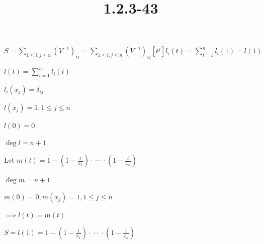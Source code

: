 \documentclass{article}
\title{1.2.3-43}
\begin{document}
\maketitle

$S = \sum_{1 \leq i,j \leq n} (V^{-1})_{ij} = \sum_{1 \leq i,j \leq n} (V^{-1})_{ij} [t^j]l_i(t) = \sum_{i=1}^n l_i(1) = l(1)$

$l(t) = \sum_{i=1}^n l_i(t)$

$l_i(x_j) = \delta_{ij}$

$l(x_j) = 1, 1 \leq j \leq n$

$l(0) = 0$

$\deg l = n + 1$

Let $m(t) = 1 - (1-\frac{t}{x_1}) \cdot\ \cdots\ \cdot (1-\frac{t}{x_n})$

$\deg m = n + 1$

$m(0) = 0, m(x_j) = 1, 1 \leq j \leq n$

$\implies l(t) = m(t)$

$S = l(1) = 1 - (1-\frac{1}{x_1}) \cdot\ \cdots\ \cdot (1-\frac{1}{x_n})$
\end{document}
